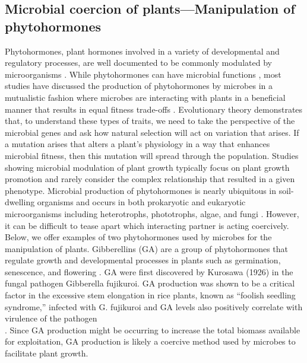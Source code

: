 \subsection{Microbial coercion of plants—Manipulation of phytohormones} 
Phytohormones, plant hormones involved in a variety of developmental and regulatory processes, are well documented to be commonly modulated by microorganisms \parencite{chanclud2016}. While phytohormones can have microbial functions \parencite{glick2020}, most studies have discussed the production of phytohormones by microbes in a mutualistic fashion where microbes are interacting with plants in a beneficial manner that results in equal fitness trade-offs \parencite{hardoim2008}. Evolutionary theory demonstrates that, to understand these types of traits, we need to take the perspective of the microbial genes and ask how natural selection will act on variation that arises. If a mutation arises that alters a plant’s physiology in a way that enhances microbial fitness, then this mutation will spread through the population. Studies showing microbial modulation of plant growth typically focus on plant growth promotion and rarely consider the complex relationship that resulted in a given phenotype. Microbial production of phytohormones is nearly ubiquitous in soil-dwelling organisms and occurs in both prokaryotic and eukaryotic microorganisms including heterotrophs, phototrophs, algae, and fungi \parencite{tsavkelova2005}. However, it can be difficult to tease apart which interacting partner is acting coercively. Below, we offer examples of two phytohormones used by microbes for the manipulation of plants.  
Gibberellins (GA) are a group of phytohormones that regulate growth and developmental processes in plants such as germination, senescence, and flowering \parencite{sun2010}. GA were first discovered by Kurosawa (1926) in the fungal pathogen Gibberella fujikuroi. GA production was shown to be a critical factor in the excessive stem elongation in rice plants, known as “foolish seedling syndrome,” infected with G. fujikuroi and GA levels also positively correlate with virulence of the pathogen\\\parencite{desjardins2000}. Since GA production might be occurring to increase the total biomass available for exploitation, GA production is likely a coercive method used by microbes to facilitate plant growth. 
